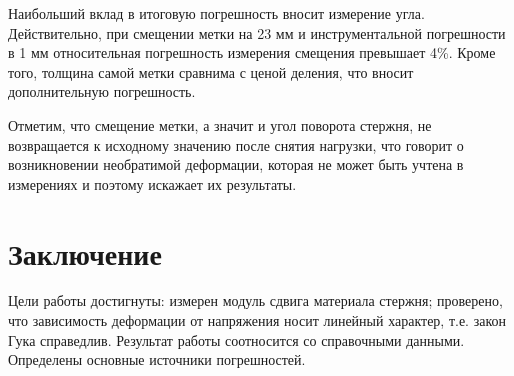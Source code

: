 \documentclass{article}
\begin{document}
Наибольший вклад в итоговую погрешность вносит измерение угла. Действительно, при смещении метки на 23 мм и инструментальной погрешности в 1 мм относительная погрешность измерения смещения превышает 4\%. Кроме того, толщина самой метки сравнима с ценой деления, что вносит дополнительную погрешность.

Отметим, что смещение метки, а значит и угол поворота стержня, не возвращается к исходному значению после снятия нагрузки, что говорит о возникновении необратимой деформации, которая не может быть учтена в измерениях и поэтому искажает их результаты. 

\section*{Заключение}
\hspace{4mm} Цели работы достигнуты: измерен модуль сдвига материала стержня; проверено, что зависимость деформации от напряжения носит линейный характер, т.е. закон Гука справедлив. Результат работы соотносится со справочными данными. Определены основные источники погрешностей.
\end{document}
